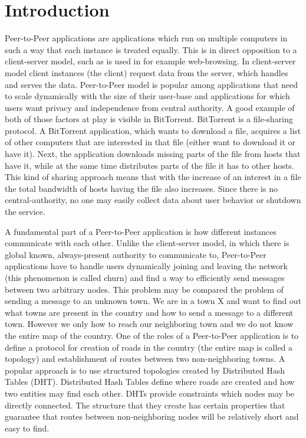 \chapter{Introduction}

Peer-to-Peer applications are applications which run on multiple computers in
such a way that each instance is treated equally.
This is in direct opposition to a client-server model, such as is used in for
example web-browsing. In client-server model client instances (the client)
request data from the server, which handles and serves the data.
Peer-to-Peer model is popular among applications that need to scale dynamically
with the size of their user-base and applications for which users want privacy
and independence from central authority.
A good example of both of those factors at play is visible in BitTorrent.
BitTorrent is a file-sharing protocol.
A BitTorrent application, which wants to download a file, acquires a list of
other computers that are interested in that file (either want to download it or
have it).
Next, the application downloads missing parts of the file from hosts that have
it, while at the same time distributes parts of the file it has to other hosts.
This kind of sharing approach means that with the increase of an interest in a
file the total bandwidth of hosts having the file also increases.
Since there is no central-authority, no one may easily collect data about user
behavior or shutdown the service.

A fundamental part of a Peer-to-Peer application is how different instances
communicate with each other.
Unlike the client-server model, in which there is global known, always-present
authority to communicate to, Peer-to-Peer applications have to handle users
dynamically joining and leaving the network (this phenomenon is called churn)
and find a way to efficiently send messages between two arbitrary nodes.
This problem may be compared the problem of sending a message to an unknown
town.
We are in a town X and want to find out what towns are present in the country
and how to send a message to a different town.
However we only how to reach our neighboring town and we do not know the entire
map of the country.
One of the roles of a Peer-to-Peer application is to define a protocol for
creation of roads in the country (the entire map is called a topology) and
establishment of routes between two non-neighboring towns.
A popular approach is to use structured topologies created by Distributed Hash
Tables (DHT). 
Distributed Hash Tables define where roads are created and how two entities may
find each other.
DHTs provide constraints which nodes may be directly connected.
The structure that they create has certain properties that guarantee that routes
between non-neighboring nodes will be relatively short and easy to find.

